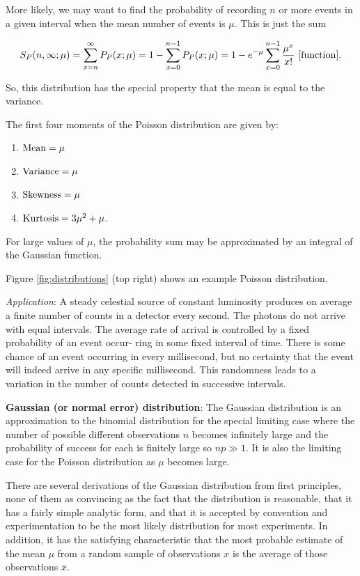 \documentclass[a4paper,10pt]{article}
\begin{document}
{\noindent}More likely, we may want to find the probability of recording $n$ or more events in a given interval when the mean number of events is $\mu$. This is just the sum 

\begin{align*}
    S_P(n,\infty;\mu) = \sum_{x=n}^\infty P_P(x;\mu)= 1-\sum_{x=0}^{n-1} P_P(x;\mu) = 1-e^{-\mu} \sum_{x=0}^{n-1} \frac{\mu^x}{x!} ~ [{\rm function}].
\end{align*}

{\noindent}So, this distribution has the special property that the mean is equal to the variance.

{\noindent}The first four moments of the Poisson distribution are given by:

\begin{enumerate}
    \item ${\rm Mean} = \mu$
    \item ${\rm Variance} = \mu$
    \item ${\rm Skewness} = \mu$
    \item ${\rm Kurtosis} = 3\mu^2+\mu$.
\end{enumerate}

{\noindent}For large values of $\mu$, the probability sum may be approximated by an integral of the Gaussian function.

{\noindent}Figure \ref{fig:distributions} (top right) shows an example Poisson distribution.

{\noindent}\textit{Application}: A steady celestial source of constant luminosity produces on average a finite number of counts in a detector every second. The photons do not arrive with equal intervals. The average rate of arrival is controlled by a fixed probability of an event occur- ring in some fixed interval of time. There is some chance of an event occurring in every millisecond, but no certainty that the event will indeed arrive in any specific millisecond. This randomness leads to a variation in the number of counts detected in successive intervals.

{\noindent}\textbf{Gaussian (or normal error) distribution}: The Gaussian distribution is an approximation to the binomial distribution for the special limiting case where the number of possible different observations $n$ becomes infinitely large and the probability of success for each is finitely large so $np\gg1$. It is also the limiting case for the Poisson distribution as $\mu$ becomes large.

{\noindent}There are several derivations of the Gaussian distribution from first principles, none of them as convincing as the fact that the distribution is reasonable, that it has a fairly simple analytic form, and that it is accepted by convention and experimentation to be the most likely distribution for most experiments. In addition, it has the satisfying characteristic that the most probable estimate of the mean $\mu$ from a random sample of observations $x$ is the average of those observations $\bar{x}$.
\end{document}
